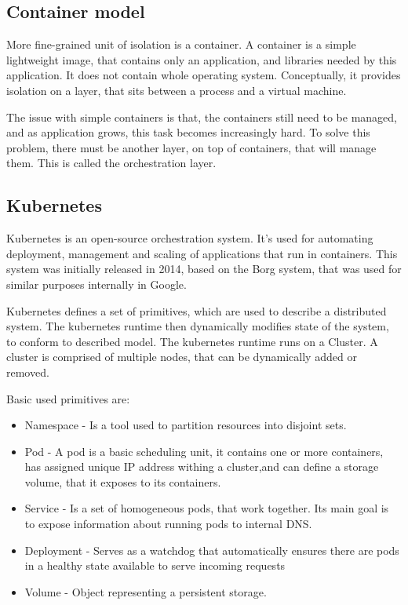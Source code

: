 \subsection{Container model}
More fine-grained unit of isolation is a container. A container is a simple lightweight image, that contains
only an application, and libraries needed by this application. It does not contain whole operating system.
Conceptually, it provides isolation on a layer, that sits between a process and a virtual machine.

The issue with simple containers is that, the containers still need to be managed, and as application
grows, this task becomes increasingly hard. To solve this problem, there must be another layer, on top of containers,
that will manage them. This is called the orchestration layer.

\subsection{Kubernetes}

Kubernetes\cite{web:k8s} is an open-source orchestration system. It's used for automating
deployment, management and scaling of applications that run in containers. This system was initially released in 2014,
based on the Borg\cite{borg} system, that was used for similar purposes internally in Google.

Kubernetes defines a set of primitives, which are used to describe a distributed system. The kubernetes
runtime then dynamically modifies state of the system, to conform to described model. The kubernetes runtime
runs on a Cluster. A cluster is comprised of multiple nodes, that can be dynamically added or removed.

Basic used primitives are:
\begin{itemize}
    \item Namespace - Is a tool used to partition resources into disjoint sets.
    \item Pod - A pod is a basic scheduling unit, it contains one or more containers, has assigned unique IP address
    withing a cluster,and can define a storage volume, that it exposes to its containers.
    \item Service - Is a set of homogeneous pods, that work together. Its main goal is to expose information about running
    pods to internal DNS.
    \item Deployment - Serves as a watchdog that automatically ensures there are pods in a healthy state available to
    serve incoming requests
    \item Volume - Object representing a persistent storage.
\end{itemize}




